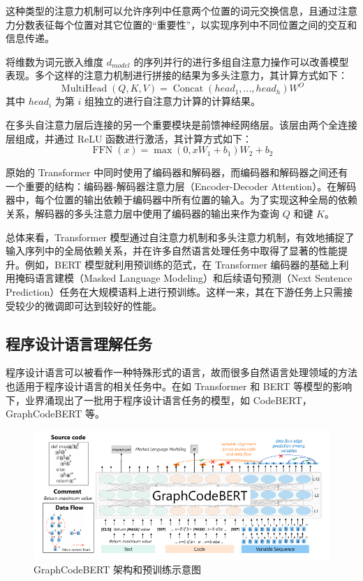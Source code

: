 这种类型的注意力机制可以允许序列中任意两个位置的词元交换信息，且通过注意力分数表征每个位置对其它位置的“重要性”，以实现序列中不同位置之间的交互和信息传递。

将维数为词元嵌入维度 $ d_{model} $ 的序列并行的进行多组自注意力操作可以改善模型表现。多个这样的注意力机制进行拼接的结果为多头注意力，其计算方式如下：
$$
\operatorname{MultiHead}(Q, K, V) = \operatorname{Concat}(head_1, ..., head_h) W^{O}
$$
其中 $head_i$ 为第 $ i $ 组独立的进行自注意力计算的计算结果。

在多头自注意力层后连接的另一个重要模块是前馈神经网络层。该层由两个全连接层组成，并通过 ReLU 函数进行激活，其计算方式如下：
$$
\operatorname{FFN}(x)= \max(0, x W_1 + b_1) W_2 + b_2
$$

原始的 Transformer 中同时使用了编码器和解码器，而编码器和解码器之间还有一个重要的结构：编码器-解码器注意力层（Encoder-Decoder Attention）。在解码器中，每个位置的输出依赖于编码器中所有位置的输入。为了实现这种全局的依赖关系，解码器的多头注意力层中使用了编码器的输出来作为查询 $Q$ 和键 $K$。

总体来看，Transformer 模型通过自注意力机制和多头注意力机制，有效地捕捉了输入序列中的全局依赖关系，并在许多自然语言处理任务中取得了显著的性能提升。例如，BERT \cite{devlin-etal-2019-bert} 模型就利用预训练的范式，在 Transformer 编码器的基础上利用掩码语言建模（Masked Language Modeling）和后续语句预测（Next Sentence Prediction）任务在大规模语料上进行预训练。这样一来，其在下游任务上只需接受较少的微调即可达到较好的性能。

\subsection{程序设计语言理解任务}

程序设计语言可以被看作一种特殊形式的语言，故而很多自然语言处理领域的方法也适用于程序设计语言的相关任务中。在如 Transformer\cite{Vaswani2017AttentionIA} 和 BERT\cite{devlin-etal-2019-bert} 等模型的影响下，业界涌现出了一批用于程序设计语言任务的模型，如 CodeBERT\cite{feng-etal-2020-codebert}，GraphCodeBERT\cite{DBLP:conf/iclr/GuoRLFT0ZDSFTDC21} 等。

\begin{figure}
    \centering
    \includegraphics[width=1.0\linewidth]{figures/GraphCodeBERT-Crop.pdf}
    \caption{GraphCodeBERT 架构和预训练示意图\cite{DBLP:conf/iclr/GuoRLFT0ZDSFTDC21}}
    \label{fig:graphCodeBERT_arch_and_pretrain}
\end{figure}

